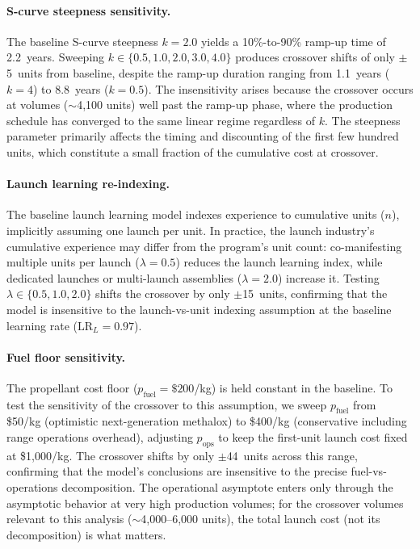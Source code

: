 \documentclass[preprint,12pt]{elsarticle}
\begin{document}
\paragraph{S-curve steepness sensitivity.} The baseline S-curve steepness $k = 2.0$ yields a 10\%-to-90\% ramp-up time of 2.2~years. Sweeping $k \in \{0.5, 1.0, 2.0, 3.0, 4.0\}$ produces crossover shifts of only $\pm$5~units from baseline, despite the ramp-up duration ranging from 1.1~years ($k = 4$) to 8.8~years ($k = 0.5$). The insensitivity arises because the crossover occurs at volumes ($\sim$4{,}100 units) well past the ramp-up phase, where the production schedule has converged to the same linear regime regardless of $k$. The steepness parameter primarily affects the timing and discounting of the first few hundred units, which constitute a small fraction of the cumulative cost at crossover.

\paragraph{Launch learning re-indexing.} The baseline launch learning model indexes experience to cumulative units ($n$), implicitly assuming one launch per unit. In practice, the launch industry's cumulative experience may differ from the program's unit count: co-manifesting multiple units per launch ($\lambda = 0.5$) reduces the launch learning index, while dedicated launches or multi-launch assemblies ($\lambda = 2.0$) increase it. Testing $\lambda \in \{0.5, 1.0, 2.0\}$ shifts the crossover by only $\pm$15~units, confirming that the model is insensitive to the launch-vs-unit indexing assumption at the baseline learning rate ($\mathrm{LR}_L = 0.97$).

\paragraph{Fuel floor sensitivity.} The propellant cost floor ($p_{\mathrm{fuel}} = \$200$/kg) is held constant in the baseline. To test the sensitivity of the crossover to this assumption, we sweep $p_{\mathrm{fuel}}$ from \$50/kg (optimistic next-generation methalox) to \$400/kg (conservative including range operations overhead), adjusting $p_{\mathrm{ops}}$ to keep the first-unit launch cost fixed at \$1{,}000/kg. The crossover shifts by only $\pm$44~units across this range, confirming that the model's conclusions are insensitive to the precise fuel-vs-operations decomposition. The operational asymptote enters only through the asymptotic behavior at very high production volumes; for the crossover volumes relevant to this analysis ($\sim$4{,}000--6{,}000 units), the total launch cost (not its decomposition) is what matters.
\end{document}
